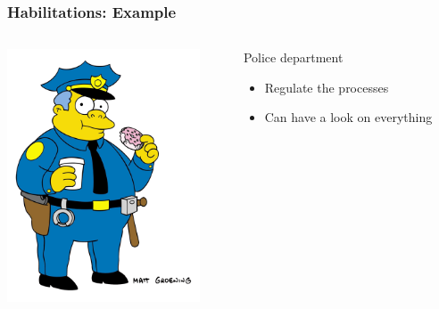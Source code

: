 \documentclass{beamer}
\begin{document}
\begin{frame}
\frametitle{Habilitations: Example}
\begin{columns}
 \begin{column}{0.45\textwidth}
         \includegraphics[height=7.5cm]{./pics/simpsons/police_Wiggum_Clancy.png}
 \end{column}
 \begin{column}{0.45\textwidth}
    \begin{block}{Police department}
        \begin{itemize}
            \item Regulate the processes
            \item Can have a look on everything 
        \end{itemize}
    \end{block}
 \end{column}
\end{columns}
\end{frame}
\end{document}
